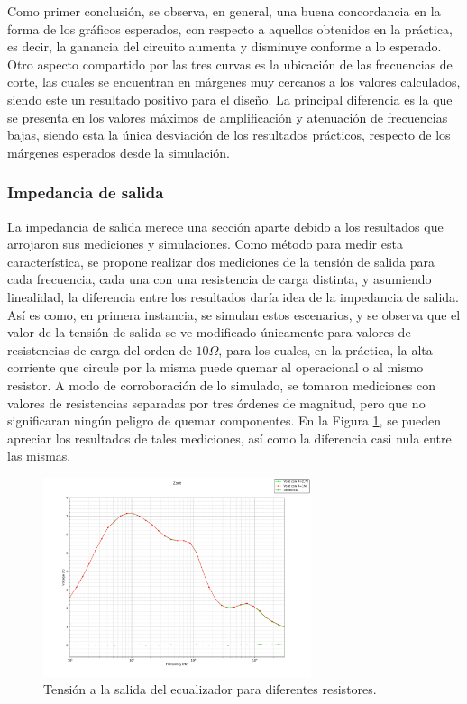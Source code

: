 Como primer conclusión, se observa, en general, una buena concordancia en la forma de los gráficos esperados, con respecto a aquellos obtenidos en la práctica, 
es decir, la ganancia del circuito aumenta y disminuye conforme a lo esperado.
Otro aspecto compartido por las tres curvas es la ubicación de las frecuencias de corte, las cuales se encuentran en márgenes muy cercanos a los valores calculados, 
siendo este un resultado positivo para el diseño.
La principal diferencia es la que se presenta en los valores máximos de amplificación y atenuación de frecuencias bajas, siendo esta la única desviación de los resultados 
prácticos, respecto de los márgenes esperados desde la simulación.


\subsubsection{Impedancia de salida}
La impedancia de salida merece una sección aparte debido a los resultados que arrojaron sus mediciones y simulaciones.
Como método para medir esta característica, se propone realizar dos mediciones de la tensión de salida para cada frecuencia, cada una con una resistencia de carga distinta, 
y asumiendo linealidad, la diferencia entre los resultados daría idea de la impedancia de salida.
Así es como, en primera instancia, se simulan estos escenarios, y se observa que el valor de la tensión de salida se ve modificado únicamente para valores de resistencias 
de carga del orden de $10 \Omega$, para los cuales, en la práctica, la alta corriente que circule por la misma puede quemar al operacional o al mismo resistor.
A modo de corroboración de lo simulado, se tomaron mediciones con valores de resistencias separadas por tres órdenes de magnitud, pero que no significaran ningún peligro 
de quemar componentes. En la Figura \ref{fig:vout_for_diff_resistors_ex5}, se pueden apreciar los resultados de tales mediciones, así como la diferencia casi nula entre 
las mismas.

\begin{figure}[H]
    \centering
    \includegraphics[width=0.7\textwidth]{../EJ5/latex_resources/Zout}
    \caption{Tensión a la salida del ecualizador para diferentes resistores.}
    \label{fig:vout_for_diff_resistors_ex5}
\end{figure}

